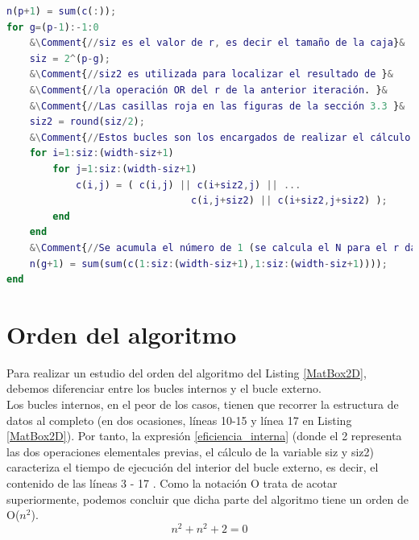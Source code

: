 \begin{lstlisting}[language=Matlab,caption={Código Matlab del método Box counting para matrices bidimensionales. Las variables de entrada del código son la matriz c (matriz binaria que queremos analizar), la lista n (inicialmente vacía, contendrá el número de cajas válidas para cada tamaño de caja) y la variable p. que representa el número de iteraciones necesarias para cubrir la matriz entera, teniendo en cuenta que cada iteración aumenta el tamaño de la caja en una potencia de dos.},label=MatBox2D]
n(p+1) = sum(c(:));
for g=(p-1):-1:0
    &\Comment{//siz es el valor de r, es decir el tamaño de la caja}&
    siz = 2^(p-g);
    &\Comment{//siz2 es utilizada para localizar el resultado de }&
    &\Comment{//la operación OR del r de la anterior iteración. }&
    &\Comment{//Las casillas roja en las figuras de la sección 3.3 }&
    siz2 = round(siz/2);
    &\Comment{//Estos bucles son los encargados de realizar el cálculo del OR}&
    for i=1:siz:(width-siz+1)
        for j=1:siz:(width-siz+1)
            c(i,j) = ( c(i,j) || c(i+siz2,j) || ...
                                c(i,j+siz2) || c(i+siz2,j+siz2) );
        end
    end
    &\Comment{//Se acumula el número de 1 (se calcula el N para el r dado)}&
    n(g+1) = sum(sum(c(1:siz:(width-siz+1),1:siz:(width-siz+1))));
end
\end{lstlisting}

\section{Orden del algoritmo}
\label{Orden}
Para realizar un estudio del orden del algoritmo del Listing \ref{MatBox2D}, debemos diferenciar entre los bucles internos y el bucle  externo.\\

Los bucles internos, en el peor de los casos, tienen que recorrer la estructura de datos al completo (en dos ocasiones, líneas 10-15 y línea 17 en Listing \ref{MatBox2D}). Por tanto, la expresión \ref{eficiencia_interna} (donde el 2 representa las dos operaciones elementales previas, el cálculo de la variable siz y siz2) caracteriza el tiempo de ejecución del interior del bucle externo, es decir, el contenido de las líneas 3 - 17 . Como la notación O trata de acotar superiormente, podemos concluir que dicha parte del algoritmo tiene un orden de O($n^2$).\\

\begin{equation}
    \label{eficiencia_interna}
    n^2 + n^2 + 2 = 0
\end{equation}

